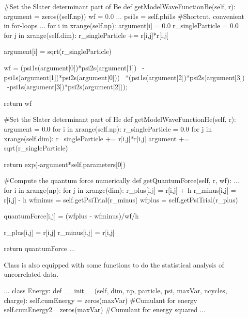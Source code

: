 \begin{Python}

  #Set the Slater determinant part of Be
  def getModelWaveFunctionBe(self, r):
    argument = zeros((self.np))
    wf = 0.0
    ...
    psi1s = self.phi1s #Shortcut, convenient in for-loops
    ...
    for i in xrange(self.np):
      argument[i] = 0.0
      r_singleParticle = 0.0
				for j in xrange(self.dim):
					r_singleParticle += 	r[i,j]*r[i,j]
	
      argument[i] = sqrt(r_singleParticle)
	
    wf = (psi1s(argument[0])*psi2s(argument[1])	\
				-psi1s(argument[1])*psi2s(argument[0]))	\
				*(psi1s(argument[2])*psi2s(argument[3])	\
				-psi1s(argument[3])*psi2s(argument[2]));
    
    return wf

  #Set the Slater determinant part of He
  def getModelWaveFunctionHe(self, r):
    argument = 0.0
    for i in xrange(self.np):
      r_singleParticle = 0.0
      for j in xrange(self.dim):
				r_singleParticle += r[i,j]*r[i,j]
      argument += sqrt(r_singleParticle)

    return exp(-argument*self.parameters[0])

	#Compute the quantum force numerically 
	def getQuantumForce(self, r, wf): 	 
    ...
    for i in xrange(np):
      for j in xrange(dim):
      				r_plus[i,j] = r[i,j] + h
				r_minus[i,j] = r[i,j] - h
				wfminus = self.getPsiTrial(r_minus) 
				wfplus = self.getPsiTrial(r_plus)
				
				quantumForce[i,j] = (wfplus - wfminus)/wf/h
				
				r_plus[i,j] = r[i,j]
				r_minus[i,j] = r[i,j]
	
    return quantumForce
...
\end{Python}
\noindent
Class  is also equipped with some functions to do the statistical analysis of uncorrelated data.

\begin{Python}
...
class Energy:	
  def __init__(self, dim, np, particle, psi, maxVar, ncycles, charge):	
    self.cumEnergy = zeros(maxVar)			  #Cumulant for energy
    self.cumEnergy2= zeros(maxVar)			#Cumulant for energy squared
		...
\end{Python}

